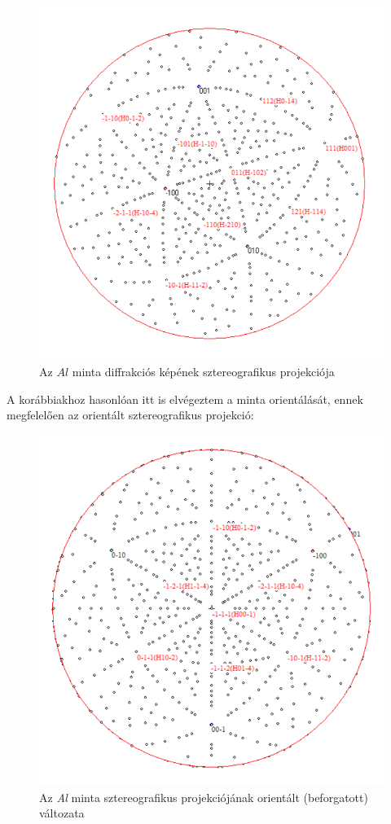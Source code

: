 \documentclass[12pt,a4paper]{article}
\begin{document}
\begin{figure}[!h]
\centering
\includegraphics[scale=1.4]{al_sztereo}
\caption{Az $Al$ minta diffrakciós képének sztereografikus projekciója}
\label{fig:al_sztereo}
\end{figure}
\newpage
A korábbiakhoz hasonlóan itt is elvégeztem a minta orientálását, ennek megfelelően az orientált sztereografikus projekció:\\
\begin{figure}[!h]
\centering
\includegraphics[scale=1.4]{al_orient}
\caption{Az \emph{Al} minta sztereografikus projekciójának orientált (beforgatott) változata}
\label{fig:al_oriented}
\end{figure}
\end{document}
